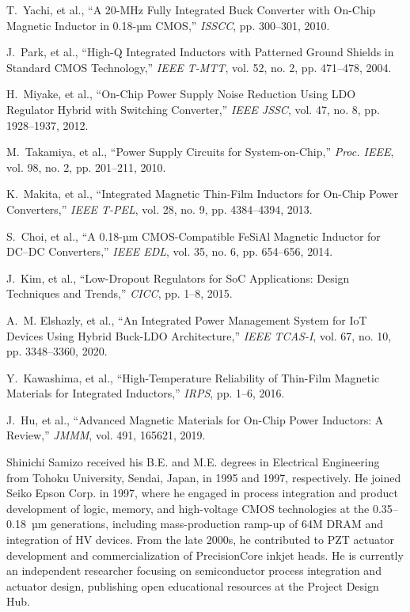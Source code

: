 \documentclass[conference]{IEEEtran}
\begin{document}

\begin{thebibliography}{10}

T.~Yachi, et al., ``A 20-MHz Fully Integrated Buck Converter with On-Chip Magnetic Inductor in 0.18-µm CMOS,'' \emph{ISSCC}, pp. 300--301, 2010.

J.~Park, et al., ``High-Q Integrated Inductors with Patterned Ground Shields in Standard CMOS Technology,'' \emph{IEEE T-MTT}, vol. 52, no. 2, pp. 471--478, 2004.

H.~Miyake, et al., ``On-Chip Power Supply Noise Reduction Using LDO Regulator Hybrid with Switching Converter,'' \emph{IEEE JSSC}, vol. 47, no. 8, pp. 1928--1937, 2012.

M.~Takamiya, et al., ``Power Supply Circuits for System-on-Chip,'' \emph{Proc. IEEE}, vol. 98, no. 2, pp. 201--211, 2010.

K.~Makita, et al., ``Integrated Magnetic Thin-Film Inductors for On-Chip Power Converters,'' \emph{IEEE T-PEL}, vol. 28, no. 9, pp. 4384--4394, 2013.

S.~Choi, et al., ``A 0.18-µm CMOS-Compatible FeSiAl Magnetic Inductor for DC--DC Converters,'' \emph{IEEE EDL}, vol. 35, no. 6, pp. 654--656, 2014.

J.~Kim, et al., ``Low-Dropout Regulators for SoC Applications: Design Techniques and Trends,'' \emph{CICC}, pp. 1--8, 2015.

A.~M. Elshazly, et al., ``An Integrated Power Management System for IoT Devices Using Hybrid Buck-LDO Architecture,'' \emph{IEEE TCAS-I}, vol. 67, no. 10, pp. 3348--3360, 2020.

Y.~Kawashima, et al., ``High-Temperature Reliability of Thin-Film Magnetic Materials for Integrated Inductors,'' \emph{IRPS}, pp. 1--6, 2016.

J.~Hu, et al., ``Advanced Magnetic Materials for On-Chip Power Inductors: A Review,'' \emph{JMMM}, vol. 491, 165621, 2019.

\end{thebibliography}

\begin{IEEEbiography}{Shinichi Samizo}
received his B.E. and M.E. degrees in Electrical Engineering from Tohoku University, Sendai, Japan, in 1995 and 1997, respectively. 
He joined Seiko Epson Corp. in 1997, where he engaged in process integration and product development of logic, memory, and high-voltage CMOS technologies at the 0.35--0.18~µm generations, including mass-production ramp-up of 64M DRAM and integration of HV devices. 
From the late 2000s, he contributed to PZT actuator development and commercialization of PrecisionCore inkjet heads. 
He is currently an independent researcher focusing on semiconductor process integration and actuator design, publishing open educational resources at the Project Design Hub.
\end{IEEEbiography}
\end{document}
